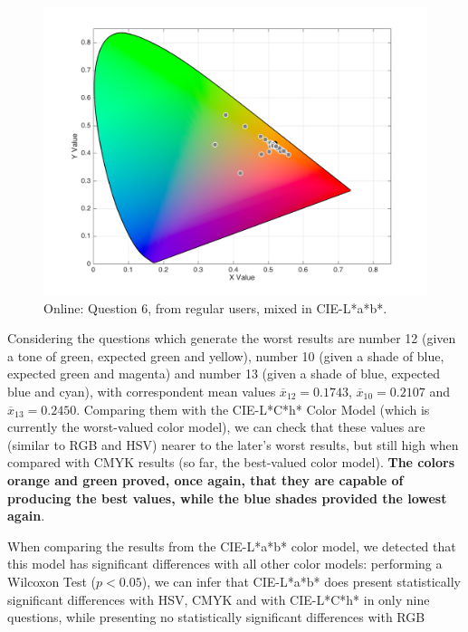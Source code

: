 \begin{figure}[!htbp]
\begin{minipage}{0.4\textwidth}
    \includegraphics[width=\textwidth]{images/results/6_online_Labresponses.png}
    \caption[Online: Answers for Question 6, from regular users, mixed in CIE-L*a*b* Color Model.]{Online: Question 6, from regular users, mixed in CIE-L*a*b*.}
    \label{fig:onlinelabregular_6}
  \end{minipage}
  \vspace{-5pt}
\end{figure}
%
Considering the questions which generate the worst results are number 12 (given a tone of green, expected green and yellow), number 10 (given a shade of blue, expected green and magenta) and number 13
(given a shade of blue, expected blue and cyan), with correspondent mean values $\overline{x}_{12} = 0.1743$, $\overline{x}_{10} = 0.2107$ and $\overline{x}_{13} = 0.2450$. Comparing them with the CIE-L*C*h* Color Model
(which is currently the worst-valued color model), we can check that these values are (similar to RGB and HSV) nearer to the later's worst results, but still high when compared with CMYK results (so far, the
best-valued color model). \textbf{The colors orange and green proved, once again, that they are capable of producing the best values, while the blue shades provided the lowest again}. \par
%
When comparing the results from the CIE-L*a*b* color model, we detected that this model has significant differences with all other color models: performing a Wilcoxon Test ($p < 0.05$), we can infer that
CIE-L*a*b* does present statistically significant differences with HSV, CMYK and with CIE-L*C*h* in only nine questions, while presenting no statistically significant differences with RGB
